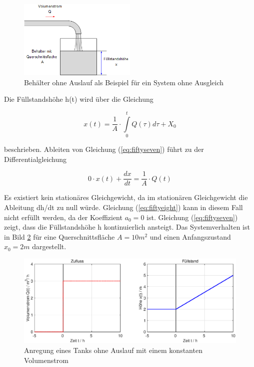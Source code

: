 \begin{figure}[H]
  \centerline{\includegraphics[width=0.5\textwidth]{Kapitel2/Bilder/image13}}
  \caption{Behälter ohne Auslauf als Beispiel für ein System ohne Ausgleich}
  \label{fig:SysohneAusgleich}
\end{figure}

\noindent Die Füllstandshöhe h(t) wird über die Gleichung


\begin{equation}\label{eq:fiftyseven}
x(t)=\frac{1}{A}\cdot\int\limits _{0}^{t}Q(\tau)d\tau+X_{0}
\end{equation}

\noindent beschrieben. Ableiten von Gleichung (\ref{eq:fiftyseven}) führt zu der Differentialgleichung

\begin{equation}\label{eq:fiftyeight}
0\cdot x(t) + \frac{dx}{dt}=\frac{1}{A}\cdot Q(t)
\end{equation}

\noindent Es existiert kein stationäres Gleichgewicht, da im stationären Gleichgewicht die Ableitung dh/dt zu null würde. Gleichung (\ref{eq:fiftyeight}) kann in diesem Fall nicht erfüllt werden, da der Koeffizient $a_{0}=0$ ist. Gleichung (\ref{eq:fiftyseven}) zeigt, dass die Füllstandshöhe h kontinuierlich ansteigt. Das Systemverhalten ist in Bild \ref{fig:Behaelter}  für eine Querschnittsfläche $A=10m^2$ und einen Anfangszustand $x_{0}=2m$ dargestellt.

\begin{figure}[H]
  \centerline{\includegraphics[width=1\textwidth]{Kapitel2/Bilder/image14}}
  \caption{Anregung eines Tanks ohne Auslauf mit einem konstanten Volumenstrom}
  \label{fig:Behaelter}
\end{figure}

